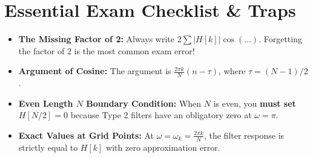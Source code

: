 \documentclass[11pt,a4paper]{article}
\begin{document}
\section{Essential Exam Checklist \& Traps}
\begin{itemize}
    \item[$\square$] \textbf{The Missing Factor of 2:} Always write $2\sum |H[k]|\cos(\dots)$. Forgetting the factor of $2$ is the most common exam error!
    \item[$\square$] \textbf{Argument of Cosine:} The argument is $\frac{2\pi k}{N}(n - \tau)$, where $\tau = (N-1)/2$.
    \item[$\square$] \textbf{Even Length $N$ Boundary Condition:} When $N$ is even, you \textbf{must set $H[N/2] = 0$} because Type 2 filters have an obligatory zero at $\omega = \pi$.
    \item[$\square$] \textbf{Exact Values at Grid Points:} At $\omega = \omega_k = \frac{2\pi k}{N}$, the filter response is strictly equal to $H[k]$ with zero approximation error.
\end{itemize}
\end{document}
